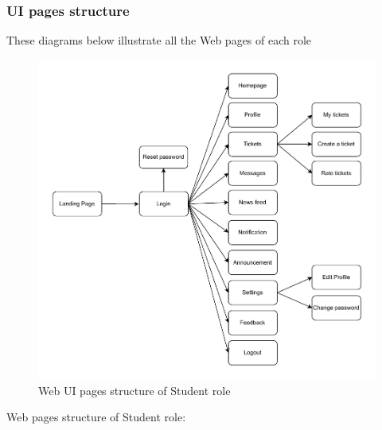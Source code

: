 	
	\subsubsection{UI pages structure}
	These diagrams below illustrate all the Web pages of each role 
	\begin{figure}[H]
		\centering
		\includegraphics[width=1\linewidth]{graphics/fe/ui-pages-std.pdf}
		\caption{Web UI pages structure of Student role}
		\label{fig:fe-ui-page-std}
	\end{figure}
	
	Web pages structure of Student role:
	
